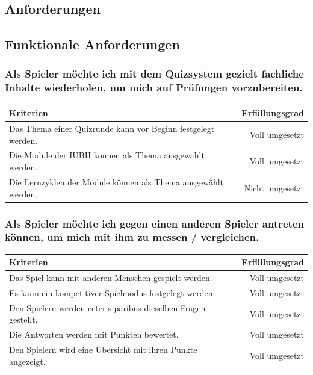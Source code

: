 \documentclass[a4paper,11pt,listof=numbered,glossary=totoc,parskip=half,toc=bib]{scrreprt}
\begin{document}
	\begin{appendices}
	\renewcommand{\appendixtocname}{Anhang}
	\renewcommand{\appendixpagename}{Anhang}
	\appendixpage	
	\addappheadtotoc
	\chapter{Anforderungen}	
		
		\section{Funktionale Anforderungen}
		
	\subsection{Als Spieler möchte ich mit dem Quizsystem gezielt fachliche Inhalte wiederholen, um mich auf
Prüfungen vorzubereiten.}

		\begin{tabularx}{\textwidth}{Xr}
			
			Kriterien & Erfüllungsgrad \\
			\midrule
		Das Thema einer Quizrunde kann vor Beginn festgelegt werden. &  Voll umgesetzt\\
		Die Module der IUBH können als Thema ausgewählt werden. & Voll umgesetzt \\
		Die Lernzyklen der Module können als Thema ausgewählt werden. & Nicht umgesetzt \\
			\bottomrule
		\end{tabularx}		
		
		\subsection{Als Spieler möchte ich gegen einen anderen Spieler antreten können, um mich mit ihm zu messen /
vergleichen.}

		\begin{tabularx}{\textwidth}{Xr}
			
			Kriterien & Erfüllungsgrad \\
			\midrule
		Das Spiel kann mit anderen Menschen gespielt werden. & Voll umgesetzt \\
		Es kann ein kompetitiver Spielmodus festgelegt werden. & Voll umgesetzt \\
		Den Spielern werden ceteris paribus dieselben Fragen gestellt. & Voll umgesetzt \\		
		Die Antworten werden mit Punkten bewertet. & Voll umgesetzt \\
		Den Spielern wird eine Übersicht mit ihren Punkte angezeigt. & Voll umgesetzt \\
			\bottomrule
		\end{tabularx}	
		

\end{appendices}
\end{document}
